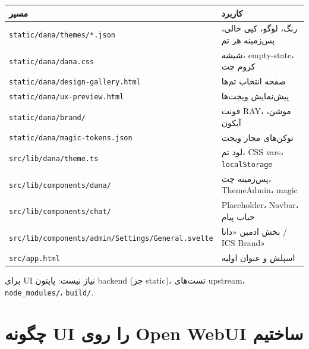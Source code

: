 \documentclass[11pt,a4paper]{article}
\begin{document}
\begin{center}
\begin{tabularx}{\textwidth}{@{}lX@{}}
\toprule
\textbf{مسیر} & \textbf{کاربرد} \\
\midrule
\textenglish{\texttt{static/dana/themes/*.json}} & رنگ، لوگو، کپی خالی، پس‌زمینه هر تم \\
\textenglish{\texttt{static/dana/dana.css}} & شیشه، \textenglish{empty-state}، کروم چت \\
\textenglish{\texttt{static/dana/design-gallery.html}} & صفحه انتخاب تم‌ها \\
\textenglish{\texttt{static/dana/ux-preview.html}} & پیش‌نمایش ویجت‌ها \\
\textenglish{\texttt{static/dana/brand/}} & فونت \textenglish{RAY}، موشن، آیکون \\
\textenglish{\texttt{static/dana/magic-tokens.json}} & توکن‌های مجاز ویجت \\
\textenglish{\texttt{src/lib/dana/theme.ts}} & لود تم، \textenglish{CSS vars}، \textenglish{\texttt{localStorage}} \\
\textenglish{\texttt{src/lib/components/dana/}} & پس‌زمینه چت، \textenglish{ThemeAdmin}، \textenglish{magic} \\
\textenglish{\texttt{src/lib/components/chat/}} & \textenglish{Placeholder}، \textenglish{Navbar}، حباب پیام \\
\textenglish{\texttt{src/lib/components/admin/Settings/General.svelte}} &
  بخش ادمین «دانا / \textenglish{ICS Brand}» \\
\textenglish{\texttt{src/app.html}} & اسپلش و عنوان اولیه \\
\bottomrule
\end{tabularx}
\end{center}

\noindent برای UI نیاز نیست: پایتون backend (جز static)، تست‌های upstream،
\textenglish{\texttt{node\_modules/}}، \textenglish{\texttt{build/}}.

\section{چگونه UI را روی Open WebUI ساختیم}
\end{document}
